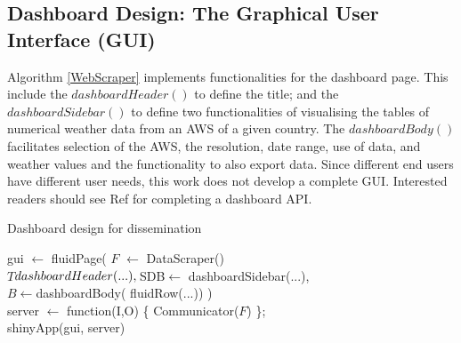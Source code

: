 \documentclass[a4paper, 10pt, conference]{ieeeconf}      %
\begin{document}
\subsection{\textbf{Dashboard Design: The Graphical User Interface (GUI)}} 
\noindent
Algorithm \ref{WebScraper} implements  functionalities for the dashboard page. This include the $dashboardHeader()$ to define the title; and   the $dashboardSidebar()$ to define  two functionalities of  visualising   the tables of numerical weather data from an  AWS of a given country. The $dashboardBody()$  facilitates selection of the AWS, the  resolution, date range, use of data,  and   weather values and the functionality to also export data. 
Since different end users have different user needs, this work does not develop a complete GUI. Interested readers should see Ref \cite{smith2020making} for completing a dashboard API.


\begin{algorithm}
	\caption{Dashboard design for dissemination}
	\label{WebScraper}
	{
		gui $\leftarrow$ fluidPage(
			{
		$F$ $\leftarrow$ DataScraper()   %
	}\\
		$T$\leftarrow$ dashboardHeader(...),\\
		$SDB$\leftarrow$ dashboardSidebar(...),\\
		$B$$\leftarrow$dashboardBody( fluidRow(...))
		)\;\\
		server $\leftarrow$ function(I,O) \{ Communicator($F$) %
		\};\\
		shinyApp(gui, server)\;
}
\end{algorithm}
\end{document}
